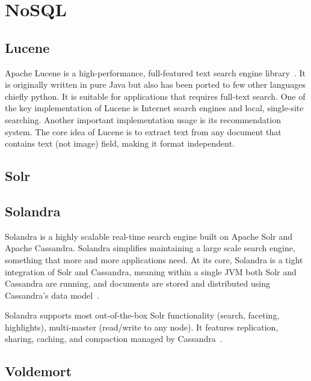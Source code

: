 \section{NoSQL}
\label{S:o-NoSQL}

\subsection{Lucene}

Apache Lucene is a high-performance, full-featured text search engine
library~\cite{www-lucene}.  It is originally written in pure Java but
also has been ported to few other languages chiefly python.  It is
suitable for applications that requires full-text search.  One of the
key implementation of Lucene is Internet search engines and local,
single-site searching.  Another important implementation usage is its
recommendation system. The core idea of Lucene is to extract text from
any document that contains text (not image) field, making it format
independent.

     \pv

\subsection{Solr}

\pv

\subsection{Solandra}
     
Solandra is a highly scalable real-time search engine built on Apache
Solr and Apache Cassandra. Solandra simplifies maintaining a large
scale search engine, something that more and more applications
need. At its core, Solandra is a tight integration of Solr and
Cassandra, meaning within a single JVM both Solr and Cassandra are
running, and documents are stored and distributed using Cassandra's
data model~\cite{github-solandra}.

Solandra supports most out-of-the-box Solr functionality (search,
faceting, highlights), multi-master (read/write to any node). It
features replication, sharing, caching, and compaction managed by
Cassandra~\cite{github-solandra2}.

     \pv
	  
\subsection{Voldemort}

